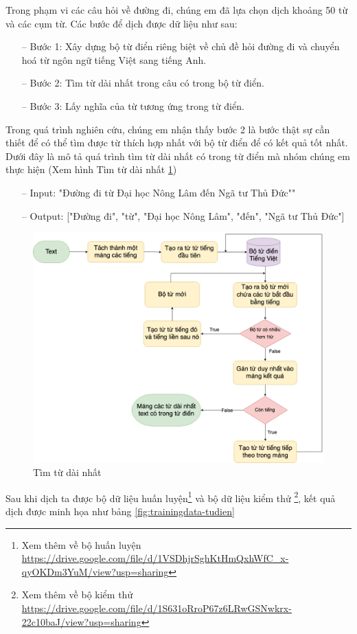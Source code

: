 Trong phạm vi các câu hỏi về đường đi, chúng em đã lựa chọn dịch khoảng 50 từ và các cụm từ. Các bước để dịch được dữ liệu như sau:
\begin{itemize}
    \item[--] Bước 1: Xây dựng bộ từ điển riêng biệt về chủ đề hỏi đường đi và chuyển hoá từ ngôn ngữ tiếng Việt sang tiếng Anh.
    \item[--] Bước 2: Tìm từ dài nhất trong câu có trong bộ từ điển.
    \item[--] Bước 3: Lấy nghĩa của từ tương ứng trong từ điển.
\end{itemize}
Trong quá trình nghiên cứu, chúng em nhận thấy bước 2 là bước thật sự cần thiết để có thể tìm được từ thích hợp nhất với bộ từ điển để có kết quả tốt nhất. Dưới đây là mô tả quá trình tìm từ dài nhất có trong từ điển mà nhóm chúng em thực hiện (Xem hình Tìm từ dài nhất \ref{fig:longest-word})
\begin{itemize}
    \item[--] Input: "Đường đi từ Đại học Nông Lâm đến Ngã tư Thủ Đức""
    \item[--] Output: ["Đường đi", "từ", "Đại học Nông Lâm", "đến", "Ngã tư Thủ Đức"]
\end{itemize}
\begin{figure}[H]
    \centering
    \includegraphics[width=15cm]{images/Diagram-longest-word.png}
    \caption{Tìm từ dài nhất}
    \label{fig:longest-word}
\end{figure}

Sau khi dịch ta được bộ dữ liệu huấn luyện\footnote{Xem thêm về bộ huấn luyện \url{https://drive.google.com/file/d/1VSDhjrSghKtHmQxhWfC_x-qyOKDm3YuM/view?usp=sharing}} và bộ dữ liệu kiểm thử \footnote{Xem thêm về bộ kiểm thử \url{https://drive.google.com/file/d/1S631oRroP67z6LRwGSNwkrx-22c10baJ/view?usp=sharing}}, kết quả dịch được minh họa như bảng \ref{fig:trainingdata-tudien}

